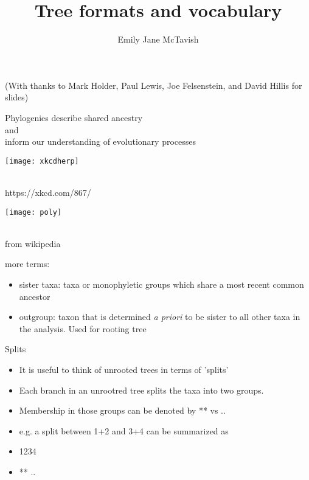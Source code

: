 \documentclass{beamer}
\title[*]{Tree formats and vocabulary}
\author[*]{Emily Jane McTavish}
\institute[*]{
Life and Environmental Sciences\\
University of California, Merced\\
\texttt{ejmctavish@ucmerced.edu, twitter:snacktavish}\\
}
\date{}
\begin{document}
\begin{frame}
\titlepage
(With thanks to Mark Holder, Paul Lewis, Joe Felsenstein, and David Hillis for slides) 
\end{frame}



\begin{frame}
\begin{center}
 \Large{Phylogenies describe shared ancestry\\
and\\
inform our understanding of evolutionary processes}
\end{center}
\end{frame}





\begin{frame}
\begin{centering}
\texttt{[image: xkcdherp]}
\end{centering}\\
https://xkcd.com/867/
\end{frame}



\begin{frame}
\begin{centering}
\texttt{[image: poly]}
\end{centering}\\
from wikipedia
\end{frame}


\begin{frame}
more terms:
\begin{itemize}
 \item sister taxa: taxa or monophyletic groups which share a most recent common ancestor
 \item outgroup: taxon that is determined \emph{a priori} to be sister to all other taxa in the analysis. Used for rooting tree
\end{itemize}

\end{frame}



\begin{frame}
Splits\\
\begin{itemize}
 \item It is useful to think of unrooted trees in terms of 'splits'
 \item Each branch in an unrootred tree splits the taxa into two groups.
 \item Membership in those groups can be denoted by ** vs .. 
 \item e.g. a split between 1+2 and 3+4 can be summarized as
 \item 1234
 \item ** ..
\end{itemize}
\end{frame}
\end{document}

